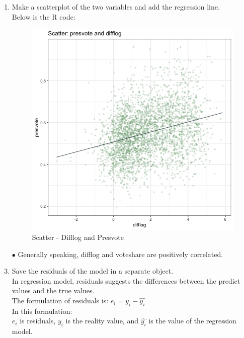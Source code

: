 \documentclass[12pt,letterpaper]{article}
\begin{document}
\begin{enumerate}
		\newpage
		
		\item Make a scatterplot of the two variables and add the regression line. \\
		
		Below is the R code:
		
		\begin{figure}[h]
			\centering
			\caption{Scatter - Difflog and Presvote}
			\includegraphics[scale=0.5]{q2_scatter.png}
		\end{figure}
		\item[$\bullet$] Generally speaking, difflog and voteshare are positively correlated.
		
		\newpage
		
		\item Save the residuals of the model in a separate object.	\\
		
		In regression model, residuals suggests the differences between the predict values and the true values. \\
		
		The formulation of residuals is: $ e_i = y_i - \hat{y_i}$ \\
		
		In this formulation: \\
		$e_i$ is residuals, $y_i$ is the reality value, and $\hat{y_i}$ is the value of the regression model. \\
		

\end{enumerate}
\end{document}
